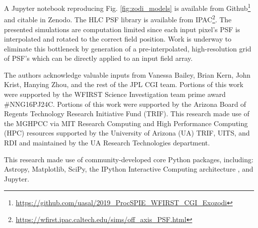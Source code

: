 \documentclass[]{spie}  %
\begin{document}
    A Jupyter notebook reproducing Fig. \ref{fig:zodi_models} is available from Github\footnote{\url{https://github.com/uasal/2019_ProcSPIE_WFIRST_CGI_Exozodi}} and citable in Zenodo\cite{douglas_douglase/2019_procspie_wfirst_cgi_exozodi_2019}. 
    The HLC PSF library is available from IPAC\footnote{\url{https://wfirst.ipac.caltech.edu/sims/off_axis_PSF.html}}.
        The presented simulations are computation limited since each input pixel's PSF is interpolated and rotated to the correct field position. Work is underway to eliminate this bottleneck by generation of a pre-interpolated, high-resolution grid of PSF's which can be directly applied to an input field array.

\acknowledgments %


The authors acknowledge valuable inputs from  Vanessa Bailey,  Brian Kern, John Krist, Hanying Zhou,   and the rest of the JPL CGI team.
Portions of this work were supported by the WFIRST Science Investigation team prime award \#NNG16PJ24C.
Portions of this work were supported by the Arizona Board of Regents Technology Research
Initiative Fund (TRIF).
This research made use of the \gls{MGHPCC} via MIT Research Computing and High Performance Computing (HPC) resources supported by the University of Arizona (UA) TRIF, UITS, and RDI and maintained by the UA Research Technologies department.


This research made use of community-developed core Python packages, including: Astropy\cite{the_astropy_collaboration_astropy_2013}, Matplotlib\cite{hunter_matplotlib_2007}, SciPy\cite{jones_scipy_2001}, 
the IPython Interactive Computing architecture \cite{perez_ipython_2007}, and Jupyter\cite{kluyver_jupyter_2016}.
\end{document}
